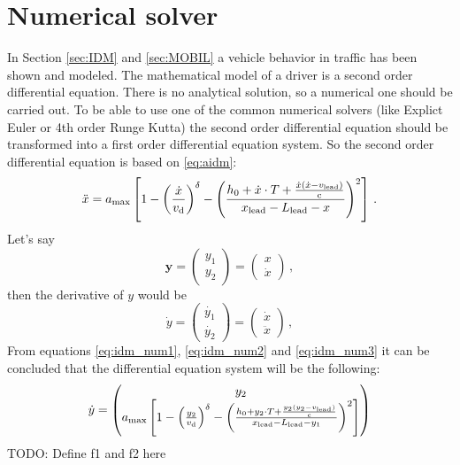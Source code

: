		\section{Numerical solver}
			In Section \ref{sec:IDM} and \ref{sec:MOBIL} a vehicle behavior in traffic has been shown and modeled. The mathematical model of a driver is a second order differential equation. There is no analytical solution, so a numerical one should be carried out. To be able to use one of the common numerical solvers (like Explict Euler or 4th order Runge Kutta) the second order differential equation should be transformed into a first order differential equation system. So the second order differential equation is based on \ref{eq:aidm}:
			\begin{equation}
				\ddot{x}=a_{\rm max}\left [ 1 - \left ( \frac{\dot{x}}{{v_{\rm d}}} \right )^\delta - \left ( \frac{h_0 + \dot{x}\cdot T + \frac{\dot{x}(\dot{x}-v_{\rm lead})}{{\rm c}}}{x_{\rm lead}-L_{\rm lead} - x} \right )^2 \right ]\,.
				\label{eq:idm_num1}
			\end{equation}
			Let's say
			\begin{equation}
				\textbf{y}=
				\begin{pmatrix}
					y_1\\
					y_2
				\end{pmatrix}
				=
				\begin{pmatrix}
					x\\
					\dot{x}
				\end{pmatrix}\,,
				\label{eq:idm_num2}
			\end{equation}
			then the derivative of $y$ would be
			\begin{equation}
				\dot{y}=
				\begin{pmatrix}
					\dot{y_1}\\
					\dot{y_2}
				\end{pmatrix}
				=
				\begin{pmatrix}
					\dot{x}\\
					\ddot{x}
				\end{pmatrix}\,,
				\label{eq:idm_num3}
			\end{equation}
			From equations \ref{eq:idm_num1}, \ref{eq:idm_num2} and \ref{eq:idm_num3} it can be concluded that the differential equation system will be the following:
			\begin{equation}
				\dot{y}=
				\begin{pmatrix}
					y_2\\
					a_{\rm max}\left [ 1 - \left ( \frac{y_2}{{v_{\rm d}}} \right )^{\delta} - \left ( \frac{h_0 + y_2\cdot T + \frac{y_2(y_2-v_{\rm lead})}{{\rm c}}}{x_{\rm lead} - L_{\rm lead} - y_1} \right )^2 \right ]
				\end{pmatrix}
				\label{eq:numerical_idm}
			\end{equation}
			TODO: Define f1 and f2 here